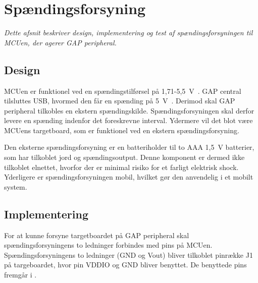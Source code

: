 \section{Spændingsforsyning}\label{spaendingsforsyning}
\textit{Dette afsnit beskriver design, implementering og test af spændingsforsyningen til MCUen, der agerer GAP peripheral.}

\subsection{Design}
MCUen er funktionel ved en spændingstilførsel på 1,71-5,5~V~\citep{Semiconductor20164200M,Semiconductor2016PRoC}. GAP central tilsluttes USB, hvormed den får en spænding på 5~V~\citep{Semiconductor2016}. Derimod skal GAP peripheral tilkobles en ekstern spændingskilde. Spændingsforsyningen skal derfor levere en spænding indenfor det foreskrevne interval. Ydermere vil det blot være MCUens targetboard, som er funktionel ved en ekstern spændingsforsyning.

Den eksterne spændingsforsyning er en batteriholder til to AAA 1,5~V batterier, som har tilkoblet jord og spændingsoutput. Denne komponent er dermed ikke tilkoblet elnettet, hvorfor der er minimal risiko for et farligt elektrisk shock. Yderligere er spændingsforsyningen mobil, hvilket gør den anvendelig i et mobilt system.

\subsection{Implementering}
For at kunne forsyne targetboardet på GAP peripheral skal spændingsforsyningens to ledninger forbindes med pins på MCUen. Spændingsforsyningens to ledninger (GND og Vout) bliver tilkoblet pinrække J1 på targeboardet, hvor pin VDDIO og GND bliver benyttet. De benyttede pins fremgår i .

